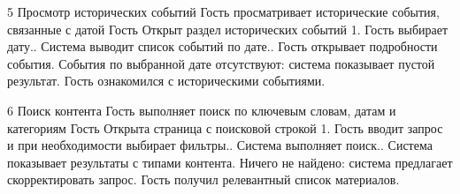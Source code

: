 \UseCase
{5}
{Просмотр исторических событий}
{Гость просматривает исторические события, связанные с датой}
{Гость}
{Открыт раздел исторических событий}
{1. Гость выбирает дату.. Система выводит список событий по дате.. Гость открывает подробности события.}
{События по выбранной дате отсутствуют: система показывает пустой результат.}
{Гость ознакомился с историческими событиями.}

\UseCase
{6}
{Поиск контента}
{Гость выполняет поиск по ключевым словам, датам и категориям}
{Гость}
{Открыта страница с поисковой строкой}
{1. Гость вводит запрос и при необходимости выбирает фильтры.. Система выполняет поиск.. Система показывает результаты с типами контента.}
{Ничего не найдено: система предлагает скорректировать запрос.}
{Гость получил релевантный список материалов.}
